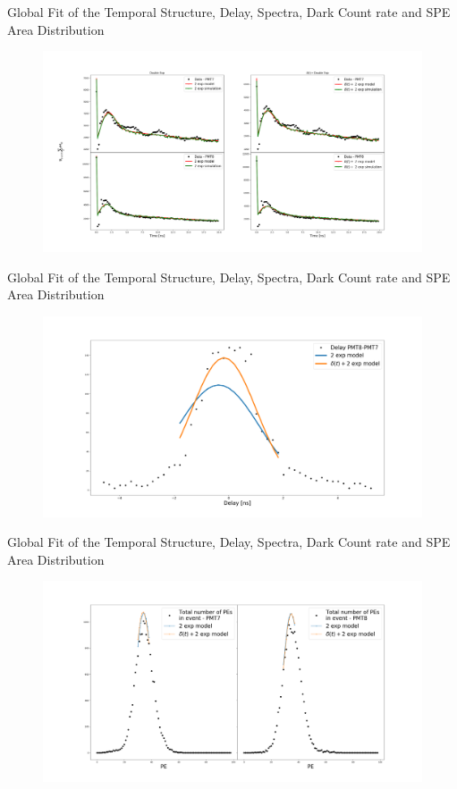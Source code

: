\documentclass{beamer}
\begin{document}
\begin{frame}{Global Fit of the Temporal Structure, Delay, Spectra, Dark Count rate and SPE Area Distribution}
\begin{figure}[h]
\includegraphics[width=1\textwidth]{data_fit.png}
\end{figure}
\end{frame}

\begin{frame}{Global Fit of the Temporal Structure, Delay, Spectra, Dark Count rate and SPE Area Distribution}
\begin{figure}[h]
\includegraphics[width=1\textwidth]{delay_fit.png}
\end{figure}
\end{frame}

\begin{frame}{Global Fit of the Temporal Structure, Delay, Spectra, Dark Count rate and SPE Area Distribution}
\begin{figure}[h]
\includegraphics[width=1\textwidth]{spectra_fit.png}
\end{figure}
\end{frame}
\end{document}
